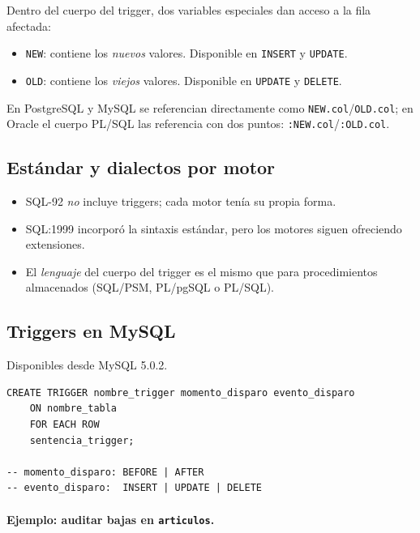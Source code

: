 \documentclass[11pt,a4paper]{article}
\begin{document}
Dentro del cuerpo del trigger, dos variables especiales dan acceso a
la fila afectada:

\begin{itemize}
    \item \texttt{NEW}: contiene los \emph{nuevos} valores. Disponible
    en \texttt{INSERT} y \texttt{UPDATE}.
    \item \texttt{OLD}: contiene los \emph{viejos} valores. Disponible
    en \texttt{UPDATE} y \texttt{DELETE}.
\end{itemize}

En PostgreSQL y MySQL se referencian directamente como
\texttt{NEW.col}/\texttt{OLD.col}; en Oracle el cuerpo PL/SQL las
referencia con dos puntos: \texttt{:NEW.col}/\texttt{:OLD.col}.

\subsection{Estándar y dialectos por motor}

\begin{itemize}
    \item SQL-92 \emph{no} incluye triggers; cada motor tenía su
    propia forma.
    \item SQL:1999 incorporó la sintaxis estándar, pero los motores
    siguen ofreciendo extensiones.
    \item El \emph{lenguaje} del cuerpo del trigger es el mismo que
    para procedimientos almacenados (SQL/PSM, PL/pgSQL o PL/SQL).
\end{itemize}

\subsection{Triggers en MySQL}

Disponibles desde MySQL 5.0.2.

\begin{lstlisting}
CREATE TRIGGER nombre_trigger momento_disparo evento_disparo
    ON nombre_tabla
    FOR EACH ROW
    sentencia_trigger;

-- momento_disparo: BEFORE | AFTER
-- evento_disparo:  INSERT | UPDATE | DELETE
\end{lstlisting}

\paragraph{Ejemplo: auditar bajas en \texttt{articulos}.}
\end{document}
